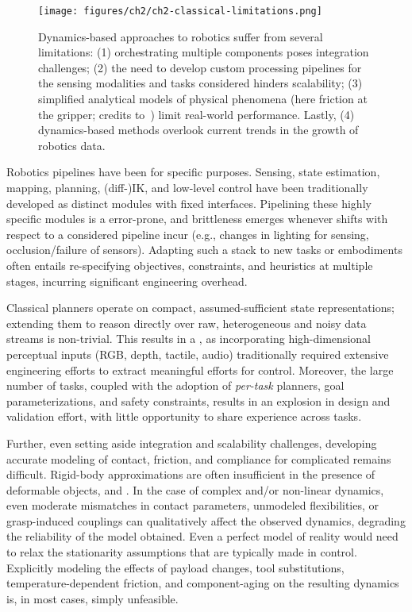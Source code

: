 \begin{figure}
    \centering
    \texttt{[image: figures/ch2/ch2-classical-limitations.png]}
    \caption{Dynamics-based approaches to robotics suffer from several limitations: (1) orchestrating multiple components poses integration challenges; (2) the need to develop custom processing pipelines for the sensing modalities and tasks considered hinders scalability; (3) simplified analytical models of physical phenomena (here friction at the gripper; credits to~\citet{antonovaReinforcementLearningPivoting2017}) limit real-world performance. Lastly, (4) dynamics-based methods overlook current trends in the growth of robotics data.}
    \label{fig:classical-limitations}
\end{figure}

Robotics pipelines have been  for specific purposes. 
Sensing, state estimation, mapping, planning, (diff-)IK, and low-level control have been traditionally developed as distinct modules with fixed interfaces.
Pipelining these highly specific modules is a error-prone, and brittleness emerges whenever shifts with respect to a considered pipeline incur (e.g., changes in lighting for sensing, occlusion/failure of sensors).
Adapting such a stack to new tasks or embodiments often entails re-specifying objectives, constraints, and heuristics at multiple stages, incurring significant engineering overhead.

Classical planners operate on compact, assumed-sufficient state representations; extending them to reason directly over raw, heterogeneous and noisy data streams is non-trivial.
This results in a , as incorporating high-dimensional perceptual inputs (RGB, depth, tactile, audio) traditionally required extensive engineering efforts to extract meaningful efforts for control. 
Moreover, the large number of tasks, coupled with the adoption of \emph{per-task} planners, goal parameterizations, and safety constraints, results in an explosion in design and validation effort, with little opportunity to share experience across tasks.

Further, even setting aside integration and scalability challenges, developing accurate modeling of contact, friction, and compliance for complicated remains difficult.
Rigid-body approximations are often insufficient in the presence of deformable objects, and .
In the case of complex and/or non-linear dynamics, even moderate mismatches in contact parameters, unmodeled flexibilities, or grasp-induced couplings can qualitatively affect the observed dynamics, degrading the reliability of  the model obtained.
Even a perfect model of reality would need to relax the stationarity assumptions that are typically made in control. Explicitly modeling the effects of payload changes, tool substitutions, temperature-dependent friction, and component-aging on the resulting dynamics is, in most cases, simply unfeasible.

